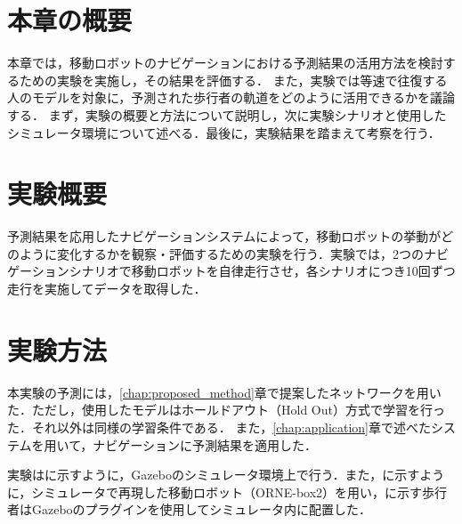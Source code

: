 

\section{本章の概要}

本章では，移動ロボットのナビゲーションにおける予測結果の活用方法を検討するための実験を実施し，その結果を評価する．
また，実験では等速で往復する人のモデルを対象に，予測された歩行者の軌道をどのように活用できるかを議論する．
まず，実験の概要と方法について説明し，次に実験シナリオと使用したシミュレータ環境について述べる．最後に，実験結果を踏まえて考察を行う．

\section{実験概要}
予測結果を応用したナビゲーションシステムによって，移動ロボットの挙動がどのように変化するかを観察・評価するための実験を行う．実験では，2つのナビゲーションシナリオで移動ロボットを自律走行させ，各シナリオにつき10回ずつ走行を実施してデータを取得した．

\section{実験方法}
本実験の予測には，\ref{chap:proposed_method}章で提案したネットワークを用いた．ただし，使用したモデルはホールドアウト（Hold Out）方式で学習を行った．それ以外は同様の学習条件である．
また，\ref{chap:application}章で述べたシステムを用いて，ナビゲーションに予測結果を適用した．

実験はに示すように，Gazebo\cite{Gazebo62:online}のシミュレータ環境上で行う．また，に示すように，シミュレータで再現した移動ロボット（ORNE-box2\cite{井口颯人2023屋外自律移動ロボットプラットフォーム-orne}）を用い，に示す歩行者はGazeboのプラグイン\cite{Actors-G87:online}を使用してシミュレータ内に配置した．


